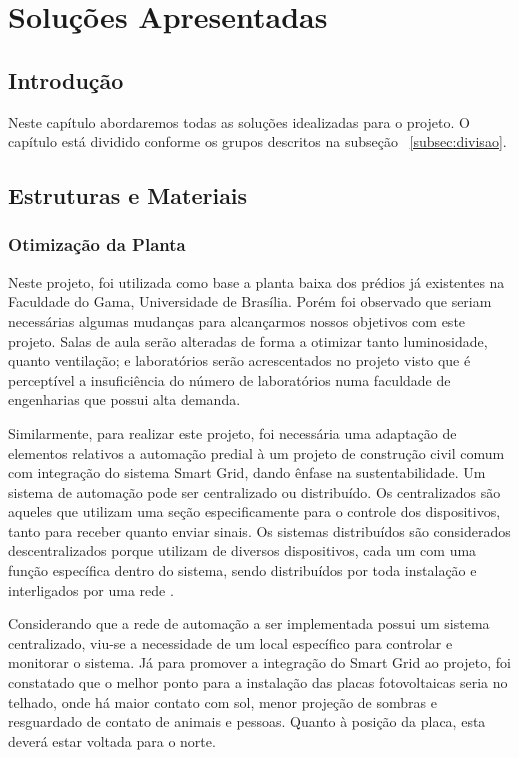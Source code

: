 \part{Soluções Apresentadas}
\chapter[Introdução]{Introdução}
Neste capítulo abordaremos todas as soluções idealizadas para o projeto. O capítulo está dividido conforme os grupos descritos na subseção ~\ref{subsec:divisao}.

\chapter[Estruturas e Materiais]{Estruturas e Materiais}
\section{Otimização da Planta}
Neste projeto, foi utilizada como base a planta baixa dos prédios já existentes na Faculdade do Gama, Universidade de Brasília. Porém foi observado que seriam necessárias algumas mudanças para alcançarmos nossos objetivos com este projeto. Salas de aula serão alteradas de forma a otimizar tanto luminosidade, quanto ventilação; e laboratórios serão acrescentados no projeto visto que é perceptível a insuficiência do número de laboratórios numa faculdade de engenharias que possui alta demanda.

Similarmente, para realizar este projeto, foi necessária uma adaptação de elementos relativos a automação predial à um projeto de construção civil comum com integração do sistema Smart Grid, dando ênfase na sustentabilidade.
Um sistema de automação pode ser centralizado ou distribuído. Os centralizados são aqueles que utilizam uma seção especificamente para o controle dos dispositivos, tanto para receber quanto enviar sinais. Os sistemas distribuídos são considerados descentralizados porque utilizam de diversos dispositivos, cada um com uma função específica dentro do sistema, sendo distribuídos por toda instalação e interligados por uma rede \cite{dias22004}.

Considerando que a rede de automação a ser implementada possui um sistema centralizado, viu-se a necessidade de um local específico para controlar e monitorar o sistema. Já para promover a integração do Smart Grid ao projeto, foi constatado que o melhor ponto para a instalação das placas fotovoltaicas seria no telhado, onde há maior contato com sol, menor projeção de sombras e resguardado de contato de animais e pessoas. Quanto à posição da placa, esta deverá estar voltada para o norte.

